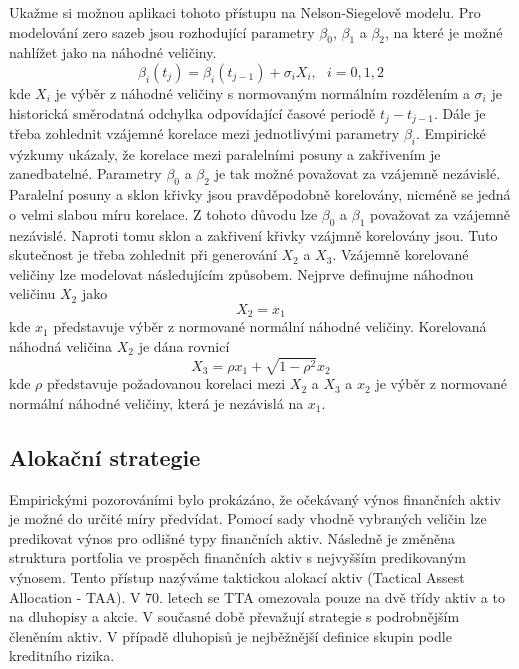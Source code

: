 \documentclass[a4paper]{book}
\begin{document}
Ukažme si možnou aplikaci tohoto přístupu na Nelson-Siegelově modelu. Pro modelování zero sazeb jsou rozhodující parametry $\beta_0$, $\beta_1$ a $\beta_2$, na které je možné nahlížet jako na náhodné veličiny.
\begin{equation*}
\beta_i(t_j) = \beta_i(t_{j-1}) + \sigma_i X_i,~~~ i = 0, 1, 2
\end{equation*}
kde $X_i$ je výběr z náhodné veličiny s normovaným normálním rozdělením a $\sigma_i$ je historická směrodatná odchylka odpovídající časové periodě $t_j - t_{j-1}$. Dále je třeba zohlednit vzájemné korelace mezi jednotlivými parametry $\beta_i$. Empirické výzkumy ukázaly, že korelace mezi paralelními posuny a zakřivením je zanedbatelné. Parametry $\beta_0$ a $\beta_2$ je tak možné považovat za vzájemně nezávislé. Paralelní posuny a sklon křivky jsou pravděpodobně korelovány, nicméně se jedná o velmi slabou míru korelace. Z tohoto důvodu lze $\beta_0$ a $\beta_1$ považovat za vzájemně nezávislé. Naproti tomu sklon a zakřivení křivky vzájmně korelovány jsou. Tuto skutečnost je třeba zohlednit při generování $X_2$ a $X_3$. Vzájemně korelované veličiny lze modelovat následujícím způsobem. Nejprve definujme náhodnou veličinu $X_2$ jako
\begin{equation*}
X_2 = x_1
\end{equation*}
kde $x_1$ představuje výběr z normované normální náhodné veličiny. Korelovaná náhodná veličina $X_2$ je dána rovnicí
\begin{equation*}
X_3 = \rho x_1 + \sqrt{1 - \rho^2} x_2
\end{equation*}  
kde $\rho$ představuje požadovanou korelaci mezi $X_2$ a $X_3$ a $x_2$ je výběr z normované normální náhodné veličiny, která je nezávislá na $x_1$.

\subsection{Alokační strategie}

Empirickými pozorováními bylo prokázáno, že očekávaný výnos finančních aktiv je možné do určité míry předvídat. Pomocí sady vhodně vybraných veličin lze predikovat výnos pro odlišné typy finančních aktiv. Následně je změněna struktura portfolia ve prospěch finančních aktiv s nejvyšším predikovaným výnosem. Tento přístup nazýváme taktickou alokací aktiv (Tactical Assest Allocation - TAA). V 70. letech se TTA omezovala pouze na dvě třídy aktiv a to na dluhopisy a akcie. V současné době převažují strategie s podrobnějším členěním aktiv. V případě dluhopisů je nejběžnější definice skupin podle kreditního rizika.
\end{document}
